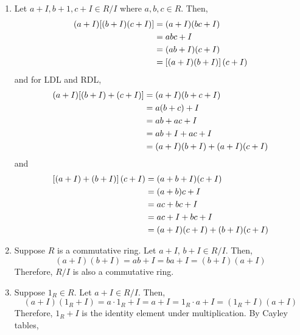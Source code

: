 \begin{solution} \phantom{blank}
    \begin{enumerate}
            \item     Let $a + I, b + 1, c + I \in R/I$ where $a, b, c \in R$. Then,
                \begin{align*}
                    \qty(a + I) \qty[(b + I)( c + I)] &= (a + I)(bc + I) \\
                    &= abc + I \\
                    &= (ab + I)(c + I) \\
                    &= \qty[(a + I)(b + I)](c + I)
                \end{align*}
                and for LDL and RDL,
                \begin{align*}
                    (a + I)\qty[(b + I) + (c + I)] &= (a + I)(b + c + I) \\
                    &= a(b + c) + I \\
                    &= ab + ac + I \\
                    &= ab + I + ac + I \\
                    &= (a + I)(b + I) + (a + I)(c + I)
                \end{align*}
                and 
                \begin{align*}
                    \qty[(a + I) + (b + I)](c + I) &= (a + b + I)(c + I) \\
                    &= (a + b)c + I \\
                    &= ac + bc + I \\
                    &= ac + I + bc + I \\
                    &= (a + I)(c + I) + (b + I)(c + I)
                \end{align*}
            \item Suppose $R$ is a commutative ring. Let $a + I$, $b + I \in R/I$. Then,
            \[ (a + I)(b + I) =  ab + I = ba + I = (b + I)(a + I)\]
            Therefore, $R/I$ is also a commutative ring.
            \item Suppose $1_R \in R$. Let $a + I \in R/I$. Then,
            \[ (a + I)(1_R + I) = a \cdot 1_R + I = a + I = 1_R \cdot a + I = (1_R + I)(a + I) \]
            Therefore, $1_R + I$ is the identity element under multiplication. By Cayley tables,
            
            \begin{center}
                \begin{multicols}{2}
                

\end{multicols}
\end{center}
\end{enumerate}
\end{solution}

